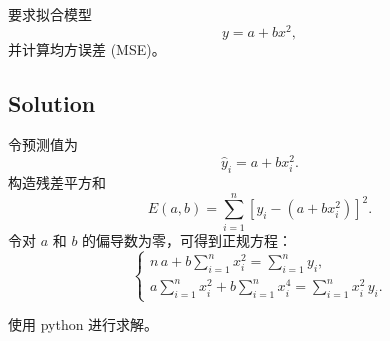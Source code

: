 \documentclass[11pt]{article}
\begin{document}
要求拟合模型 \[
y = a + b x^2,
\] 并计算均方误差 (MSE)。

\subsection{Solution}\label{solution}

令预测值为\\
\[
\hat{y}_i = a + b x_i^2.
\] 构造残差平方和\\
\[
E(a,b) = \sum_{i=1}^{n} \left[y_i - \left(a + b x_i^2\right)\right]^2.
\] 令对 \(a\) 和 \(b\) 的偏导数为零，可得到正规方程： \[
\begin{cases}
n\,a + b\sum_{i=1}^{n}x_i^2 = \sum_{i=1}^{n}y_i,\\[1mm]
a\sum_{i=1}^{n}x_i^2 + b\sum_{i=1}^{n}x_i^4 = \sum_{i=1}^{n}x_i^2\,y_i.
\end{cases}
\]

使用 python 进行求解。
\end{document}
